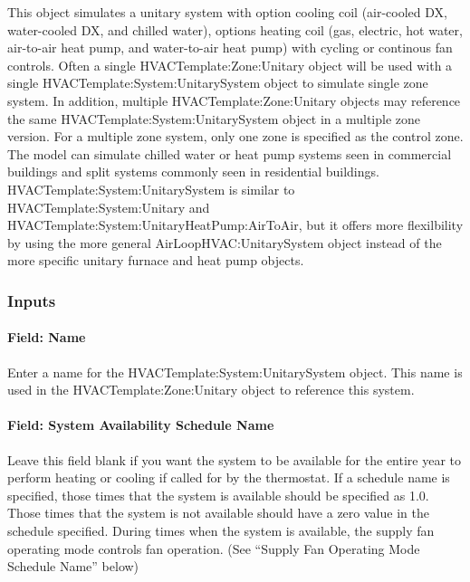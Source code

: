 This object simulates a unitary system with option cooling coil (air-cooled DX, water-cooled DX, and chilled water), options heating coil (gas, electric, hot water, air-to-air heat pump, and water-to-air heat pump) with cycling or continous fan controls. Often a single HVACTemplate:Zone:Unitary object will be used with a single HVACTemplate:System:UnitarySystem object to simulate single zone system. In addition, multiple HVACTemplate:Zone:Unitary objects may reference the same HVACTemplate:System:UnitarySystem object in a multiple zone version. For a multiple zone system, only one zone is specified as the control zone. The model can simulate chilled water or heat pump systems seen in commercial buildings and split systems commonly seen in residential buildings. HVACTemplate:System:UnitarySystem is similar to HVACTemplate:System:Unitary and HVACTemplate:System:UnitaryHeatPump:AirToAir, but it offers more flexilbility by using the more general AirLoopHVAC:UnitarySystem object instead of the more specific unitary furnace and heat pump objects.

\subsubsection{Inputs}\label{inputs-17-003}

\paragraph{Field: Name}\label{field-name-4-013}

Enter a name for the HVACTemplate:System:UnitarySystem object. This name is used in the HVACTemplate:Zone:Unitary object to reference this system.

\paragraph{Field: System Availability Schedule Name}\label{field-system-availability-schedule-name-9}

Leave this field blank if you want the system to be available for the entire year to perform heating or cooling if called for by the thermostat. If a schedule name is specified, those times that the system is available should be specified as 1.0. Those times that the system is not available should have a zero value in the schedule specified. During times when the system is available, the supply fan operating mode controls fan operation. (See ``Supply Fan Operating Mode Schedule Name'' below)

